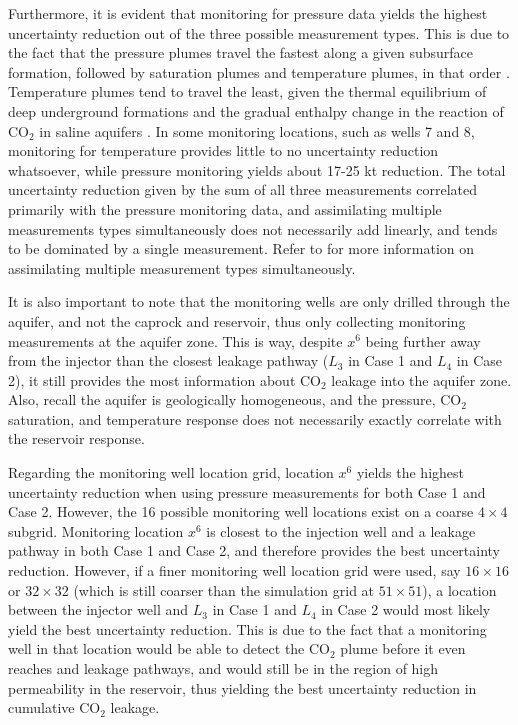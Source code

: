 \documentclass[10pt, twoside]{article}
\begin{document}
Furthermore, it is evident that monitoring for pressure data yields the highest uncertainty reduction out of the three possible measurement types. This is due to the fact that the pressure plumes travel the fastest along a given subsurface formation, followed by saturation plumes and temperature plumes, in that order \citep{Chadwick2006303}. Temperature plumes tend to travel the least, given the thermal equilibrium of deep underground formations and the gradual enthalpy change in the reaction of CO$_2$ in saline aquifers \citep{koschel2006enthalpy}. In some monitoring locations, such as wells 7 and 8, monitoring for temperature provides little to no uncertainty reduction whatsoever, while pressure monitoring yields about 17-25 kt reduction. The total uncertainty reduction given by the sum of all three measurements correlated primarily with the pressure monitoring data, and assimilating multiple measurements types simultaneously does not necessarily add linearly, and tends to be dominated by a single measurement. Refer to \citet{Chen2018} for more information on assimilating multiple measurement types simultaneously.

It is also important to note that the monitoring wells are only drilled through the aquifer, and not the caprock and reservoir, thus only collecting monitoring measurements at the aquifer zone. This is way, despite $x^6$ being further away from the injector than the closest leakage pathway ($L_3$ in Case 1 and $L_4$ in Case 2), it still provides the most information about CO$_2$ leakage into the aquifer zone. Also, recall the aquifer is geologically homogeneous, and the pressure, CO$_2$ saturation, and temperature response does not necessarily exactly correlate with the reservoir response.

Regarding the monitoring well location grid, location $x^6$ yields the highest uncertainty reduction when using pressure measurements for both Case 1 and Case 2. However, the 16 possible monitoring well locations exist on a coarse $4\times 4$ subgrid. Monitoring location $x^6$ is closest to the injection well and a leakage pathway in both Case 1 and Case 2, and therefore provides the best uncertainty reduction. However, if a finer monitoring well location grid were used, say $16 \times 16$ or $32 \times 32$ (which is still coarser than the simulation grid at $51 \times 51$), a location between the injector well and $L_3$ in Case 1 and $L_4$ in Case 2 would most likely yield the best uncertainty reduction. This is due to the fact that a monitoring well in that location would be able to detect the CO$_2$ plume before it even reaches and leakage pathways, and would still be in the region of high permeability in the reservoir, thus yielding the best uncertainty reduction in cumulative CO$_2$ leakage. 
\end{document}
